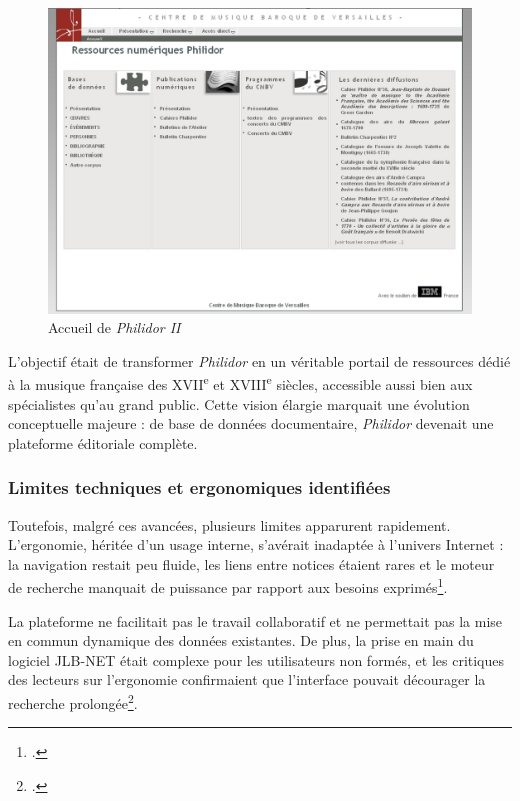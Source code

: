 \begin{figure}[h]
	\caption{Accueil de \textit{Philidor II}} \label{philidor_ii}
	\centering
	\includegraphics[width=\textwidth]{images/philidor2.png}
\end{figure}

L'objectif était de transformer \textit{Philidor} en un véritable portail de ressources dédié à la musique française des XVII\textsuperscript{e} et XVIII\textsuperscript{e} siècles, accessible aussi bien aux spécialistes qu'au grand public. Cette vision élargie marquait une évolution conceptuelle majeure : de base de données documentaire, \textit{Philidor} devenait une plateforme éditoriale complète.

\subsubsection{Limites techniques et ergonomiques identifiées}

Toutefois, malgré ces avancées, plusieurs limites apparurent rapidement. L'ergonomie, héritée d'un usage interne, s'avérait inadaptée à l'univers Internet : la navigation restait peu fluide, les liens entre notices étaient rares et le moteur de recherche manquait de puissance par rapport aux besoins exprimés\footcite[Présentation de la base de données PHILIDOR en Octobre 2010]{michelbenoitDocumentationTechniqueBibliographique1997}.

La plateforme ne facilitait pas le travail collaboratif et ne permettait pas la mise en commun dynamique des données existantes. De plus, la prise en main du logiciel JLB-NET était complexe pour les utilisateurs non formés, et les critiques des lecteurs sur l'ergonomie confirmaient que l'interface pouvait décourager la recherche prolongée\footcite[Présentation de la base de données PHILIDOR en Octobre 2010]{michelbenoitDocumentationTechniqueBibliographique1997}.

